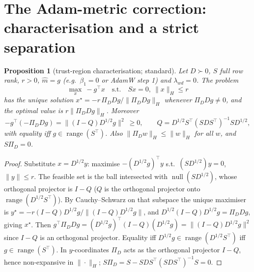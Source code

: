 \documentclass[11pt]{article}
\newtheorem{proposition}{Proposition}
\theoremstyle{remark}
\begin{document}
\section{The Adam-metric correction: characterisation and a strict separation}
\begin{proposition}[trust-region characterisation; standard]\label{p:tr}
Let $D\succ0$, $S$ full row rank, $r>0$, $\hat m=g$ (e.g.\ $\beta_1=0$ or AdamW step 1) and $\lambda_{wd}=0$. The problem
\[ \max_x\ -g^\top x\quad\text{s.t.}\quad Sx=0,\ \|x\|_H\le r \]
has the unique solution $x^\star=-r\,\Pi_D Dg/\|\Pi_D Dg\|_H$ whenever $\Pi_D Dg\ne0$, and the optimal value is
$r\|\Pi_D Dg\|_H$. Moreover
\[ -g^\top(-\Pi_D Dg)=\|(I-Q)D^{1/2}g\|^2\ \ge 0,\qquad Q=D^{1/2}S^\top(SDS^\top)^{-1}SD^{1/2}, \tag{2}\]
with equality iff $g\in\operatorname{range}(S^\top)$. Also $\|\Pi_D w\|_H\le\|w\|_H$ for all $w$, and $S\Pi_D=0$.
\end{proposition}
\begin{proof}
Substitute $x=D^{1/2}y$: maximise $-(D^{1/2}g)^\top y$ s.t.\ $(SD^{1/2})y=0$, $\|y\|\le r$. The feasible set is the ball
intersected with $\operatorname{null}(SD^{1/2})$, whose orthogonal projector is $I-Q$ ($Q$ is the orthogonal projector onto
$\operatorname{range}(D^{1/2}S^\top)$). By Cauchy--Schwarz on that subspace the unique maximiser is
$y^\star=-r(I-Q)D^{1/2}g/\|(I-Q)D^{1/2}g\|$, and $D^{1/2}(I-Q)D^{1/2}g=\Pi_D Dg$, giving $x^\star$. Then
$g^\top\Pi_D Dg=(D^{1/2}g)^\top(I-Q)(D^{1/2}g)=\|(I-Q)D^{1/2}g\|^2$ since $I-Q$ is an orthogonal projector. Equality
iff $D^{1/2}g\in\operatorname{range}(D^{1/2}S^\top)$ iff $g\in\operatorname{range}(S^\top)$. In $y$-coordinates
$\Pi_D$ acts as the orthogonal projector $I-Q$, hence non-expansive in $\|\cdot\|_H$; $S\Pi_D=S-SDS^\top(SDS^\top)^{-1}S=0$.
\end{proof}
\end{document}
